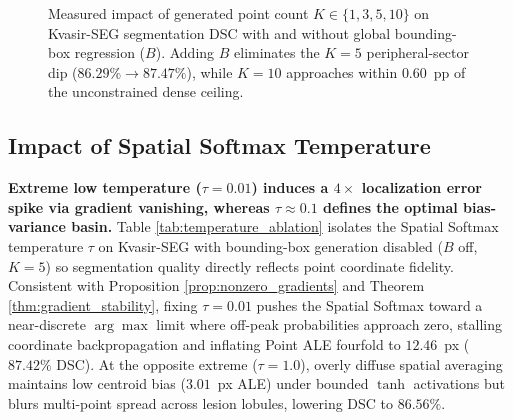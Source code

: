 \documentclass[onecolumn]{IEEEtran}
\numberwithin{equation}{section}
\theoremstyle{definition}
\theoremstyle{remark}
\begin{document}
\begin{figure}[!htbp]
\centering
{}
\caption{Measured impact of generated point count $K \in \{1, 3, 5, 10\}$ on Kvasir-SEG segmentation DSC with and without global bounding-box regression ($B$). Adding $B$ eliminates the $K=5$ peripheral-sector dip ($86.29\% \rightarrow 87.47\%$), while $K=10$ approaches within $0.60$~pp of the unconstrained dense ceiling.}
\label{fig:ablation_k}
\end{figure}

\subsection{Impact of Spatial Softmax Temperature}

\textbf{Extreme low temperature ($\tau = 0.01$) induces a $4\times$ localization error spike via gradient vanishing, whereas $\tau \approx 0.1$ defines the optimal bias-variance basin.} Table \ref{tab:temperature_ablation} isolates the Spatial Softmax temperature $\tau$ on Kvasir-SEG with bounding-box generation disabled ($B$ off, $K = 5$) so segmentation quality directly reflects point coordinate fidelity. Consistent with Proposition \ref{prop:nonzero_gradients} and Theorem \ref{thm:gradient_stability}, fixing $\tau = 0.01$ pushes the Spatial Softmax toward a near-discrete $\arg\max$ limit where off-peak probabilities approach zero, stalling coordinate backpropagation and inflating Point ALE fourfold to $12.46$~px ($87.42\%$ DSC). At the opposite extreme ($\tau = 1.0$), overly diffuse spatial averaging maintains low centroid bias ($3.01$~px ALE) under bounded $\tanh$ activations but blurs multi-point spread across lesion lobules, lowering DSC to $86.56\%$.
\end{document}
